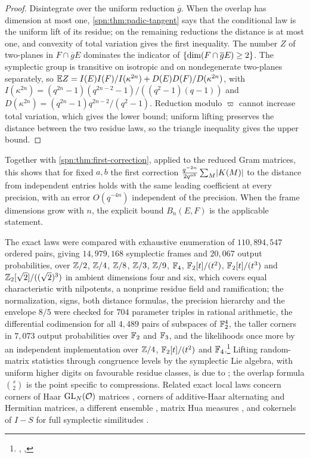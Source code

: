 \begin{proof}
Disintegrate over the uniform reduction $\overline g$. When the overlap has dimension at most one,
\cref{spn:thm:padic-tangent} says that the conditional law is the uniform lift of its residue; on
the remaining reductions the distance is at most one, and convexity of total variation gives the
first inequality. The number $Z$ of two-planes in $F\cap\overline gE$ dominates the indicator of
$\{\dim(F\cap\overline gE)\ge2\}$. The symplectic group is transitive on isotropic and on
nondegenerate two-planes separately, so $\mathbb{E} Z=I(E)I(F)/I(\kappa^{2n})+D(E)D(F)/D(\kappa^{2n})$, with
$I(\kappa^{2n})=(q^{2n}-1)(q^{2n-2}-1)/((q^2-1)(q-1))$ and $D(\kappa^{2n})=(q^{2n}-1)q^{2n-2}/(q^2-1)$.
Reduction modulo $\varpi$ cannot increase total variation, which gives the lower bound;
uniform lifting preserves the distance between the two residue laws, so the triangle inequality
gives the upper bound.
\end{proof}

Together with \cref{spn:thm:first-correction}, applied to the reduced Gram matrices, this shows
that for fixed $a,b$ the first correction $\frac{q^{-2n}}{2q^{ab}}\sum_M\lvert K(M)\rvert$ to the distance
from independent entries holds with the same leading coefficient at every precision, with an error
$O(q^{-4n})$ independent of the precision. When the frame dimensions grow with $n$, the explicit
bound $B_n(E,F)$ is the applicable statement.

The exact laws were compared with exhaustive enumeration of $110{,}894{,}547$ ordered pairs, giving
$14{,}979{,}168$ symplectic frames and $20{,}067$ output probabilities, over $\mathbb{Z}/2$, $\mathbb{Z}/4$, $\mathbb{Z}/8$,
$\mathbb{Z}/3$, $\mathbb{Z}/9$, $\mathbb{F}_4$, $\mathbb{F}_2[t]/(t^2)$, $\mathbb{F}_2[t]/(t^3)$ and $\mathbb{Z}_2[\sqrt2]/((\sqrt2)^3)$ in
ambient dimensions four and six, which covers equal characteristic with nilpotents, a nonprime
residue field and ramification; the normalization, signs, both distance formulas, the precision
hierarchy and the envelope $8/5$ were checked for $704$ parameter triples in rational arithmetic,
the differential codimension for all $4{,}489$ pairs of subspaces of $\mathbb{F}_2^4$, the taller corners
in $7{,}073$ output probabilities over $\mathbb{F}_2$ and $\mathbb{F}_3$, and the likelihoods once more by an
independent implementation over $\mathbb{Z}/4$, $\mathbb{F}_2[t]/(t^2)$ and
$\mathbb{F}_4$.\footnote{\raggedright{},
,
}
Lifting random-matrix statistics through congruence levels by the symplectic Lie algebra, with
uniform higher digits on favourable residue classes, is due to
\cite[Sections~8.2.1--8.2.3]{Pirani2024Traces}; the overlap formula $\binom s2$ is the point
specific to compressions. Related exact local laws concern corners of Haar $\operatorname{GL}_N(\mathcal{O})$ matrices
\cite{VanPeski2021Limits}, corners of additive-Haar alternating and Hermitian matrices, a
different ensemble \cite{ShenVanPeski2025NonArchimedean}, matrix Hua measures
\cite{Neretin2013Hua}, and cokernels of $I-S$ for full symplectic similitudes
\cite{Garton2015Random}.

